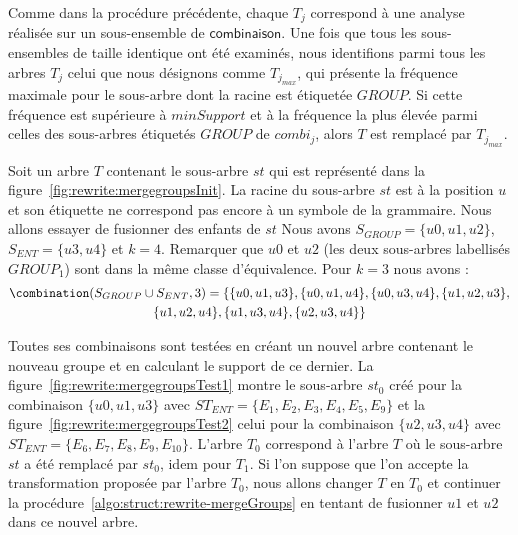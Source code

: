 Comme dans la procédure précédente, chaque $T_j$ correspond à une analyse réalisée sur un sous-ensemble de $\textsf{combinaison}$.
Une fois que tous les sous-ensembles de taille identique ont été examinés, nous identifions parmi tous les arbres $T_j$ celui que nous désignons comme $T_{j_{max}}$, qui présente la fréquence maximale pour le sous-arbre dont la racine est étiquetée $GROUP$.
Si cette fréquence est supérieure à $minSupport$ et à la fréquence la plus élevée parmi celles des sous-arbres étiquetés $GROUP$ de $combi_j$, alors $T$ est remplacé par $T_{j_{max}}$.

\begin{example}
    Soit un arbre $T$ contenant le sous-arbre $st$ qui est représenté dans la figure~\ref{fig:rewrite:mergegroupsInit}.
    La racine du sous-arbre $st$ est à la position $u$ et son étiquette ne correspond pas encore à un symbole de la grammaire.
    Nous allons essayer de fusionner des enfants de $st$
    Nous avons $S_{GROUP}=\{u0, u1, u2\}$, $S_{ENT}=\{u3, u4\}$ et $k=4$.
    Remarquer que $u0$ et $u2$ (les deux sous-arbres labellisés $GROUP_1$) sont dans la même classe d'équivalence.
    Pour $k=3$ nous avons :
    \begin{multline*}
        \combination(S_{GROUP} \cup S_{ENT}, 3) = \{\{u0, u1, u3\},\{u0, u1, u4\}, \{u0, u3, u4\}, \{u1, u2, u3\},\\\{u1, u2, u4\}, \{u1, u3, u4\}, \{u2, u3, u4\} \}
    \end{multline*}

    Toutes ses combinaisons sont testées en créant un nouvel arbre contenant le nouveau groupe et en calculant le support de ce dernier.
    La figure~\ref{fig:rewrite:mergegroupsTest1} montre le sous-arbre $st_0$ créé pour la combinaison $\{u0, u1, u3\}$ avec $ST_{ENT}=\{E_1, E_2, E_3, E_4, E_5, E_9\}$ et la figure~\ref{fig:rewrite:mergegroupsTest2} celui pour la combinaison $\{u2, u3, u4\}$ avec $ST_{ENT}=\{E_6, E_7, E_8, E_9, E_{10}\}$.
    L'arbre $T_0$ correspond  à l'arbre $T$ où le sous-arbre $st$ a été remplacé par $st_0$, idem pour $T_1$.
    Si l'on suppose que l'on accepte la transformation proposée par l'arbre $T_0$, nous allons changer $T$ en $T_0$ et continuer la procédure~\ref{algo:struct:rewrite-mergeGroups} en tentant de fusionner $u1$ et $u2$ dans ce nouvel arbre.
\end{example}

